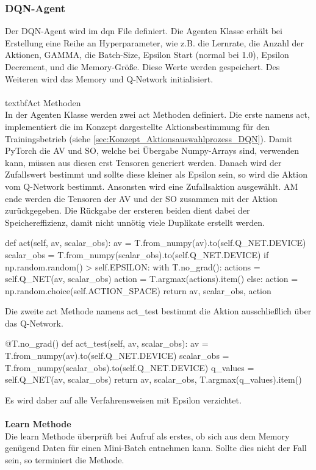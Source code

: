 \subsubsection{DQN-Agent}
Der DQN-Agent wird im dqn File definiert. Die Agenten Klasse erhält bei Erstellung eine Reihe an Hyperparameter, wie z.B. die Lernrate, die Anzahl der Aktionen, GAMMA, die Batch-Size, Epsilon Start (normal bei 1.0), Epsilon Decrement, und die Memory-Größe. Diese Werte werden gespeichert. Des Weiteren wird das Memory und Q-Network initialisiert.\\
\\textbf{Act Methoden}
\\In der Agenten Klasse werden zwei act Methoden definiert. Die erste namens act, implementiert die im Konzept dargestellte Aktionsbestimmung für den Trainingsbetrieb (siehe \ref{sec:Konzept_Aktionsauswahlprozess_DQN}). Damit PyTorch die AV und SO, welche bei Übergabe Numpy-Arrays sind, verwenden kann, müssen aus diesen erst Tensoren generiert werden. Danach wird der Zufallswert bestimmt und sollte diese kleiner als Epsilon sein, so wird die Aktion vom Q-Network bestimmt. Ansonsten wird eine Zufallsaktion ausgewählt. AM ende werden die Tensoren der AV und der SO zusammen mit der Aktion zurückgegeben. Die Rückgabe der ersteren beiden dient dabei der Speichereffizienz, damit nicht unnötig viele Duplikate erstellt werden.\\
\begin{python}
	def act(self, av, scalar_obs):
		av = T.from_numpy(av).to(self.Q_NET.DEVICE)
		scalar_obs = T.from_numpy(scalar_obs).to(self.Q_NET.DEVICE)
		if np.random.random() > self.EPSILON:
			with T.no_grad():
				actions = self.Q_NET(av, scalar_obs)
				action = T.argmax(actions).item()
		else:
			action = np.random.choice(self.ACTION_SPACE)
		return av, scalar_obs, action
\end{python}
Die zweite act Methode namens act\_test bestimmt die Aktion ausschließlich über das Q-Network. 
\begin{python}
	@T.no_grad()
	def act_test(self, av, scalar_obs):
		av = T.from_numpy(av).to(self.Q_NET.DEVICE)
		scalar_obs = T.from_numpy(scalar_obs).to(self.Q_NET.DEVICE)
		q_values = self.Q_NET(av, scalar_obs)
		return av, scalar_obs, T.argmax(q_values).item()
\end{python}
Es wird daher auf alle Verfahrensweisen mit Epsilon verzichtet.\\
\\\textbf{Learn Methode}\\
Die learn Methode überprüft bei Aufruf als erstes, ob sich aus dem Memory genügend Daten für einen Mini-Batch entnehmen kann. Sollte dies nicht der Fall sein, so terminiert die Methode.
